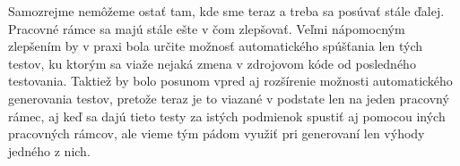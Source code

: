 \documentclass[11pt,twoside,slovak,a4paper]{article}
\begin{document}
	Samozrejme nemôžeme ostať tam, kde sme teraz a treba sa posúvať stále ďalej. Pracovné rámce sa majú stále ešte v čom zlepšovať. Veľmi nápomocným zlepšením by v praxi bola určite možnosť automatického spúšťania len tých testov, ku ktorým sa viaže nejaká zmena v zdrojovom kóde od posledného testovania. Taktiež by bolo posunom vpred aj rozšírenie možnosti automatického generovania testov, pretože teraz je to viazané v podstate len na jeden pracovný rámec, aj keď sa dajú tieto testy za istých podmienok spustiť aj pomocou iných pracovných rámcov, ale vieme tým pádom využiť pri generovaní len výhody jedného z nich. 

	
	
	
\end{document}
